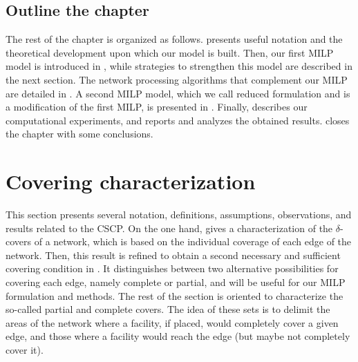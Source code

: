 \subsection{Outline the chapter}
The rest of the chapter is organized as follows.  presents useful notation and the theoretical development upon which our model is built. Then, our first MILP model is introduced in , while strategies to strengthen this model are described in the next section. The network processing algorithms that complement our MILP are detailed in . A second MILP model, which we call reduced formulation and is a modification of the first MILP, is presented in . Finally,  describes our computational experiments, and reports and analyzes the obtained results.  closes the chapter with some conclusions.





\section{Covering characterization}\label{sec:prelim}
This section presents several notation, definitions, assumptions, observations, and results related to the CSCP. On the one hand,  gives a characterization of the $\delta$-covers of a network, which is based on the individual coverage of each edge of the network. Then, this result is refined to obtain a second necessary and sufficient covering condition in . It distinguishes between two alternative possibilities for covering each edge, namely complete or partial, and will be useful for our MILP formulation and methods. The rest of the section is oriented to characterize the so-called partial and complete covers. The idea of these sets is to delimit the areas of the network where a facility, if placed, would completely cover a given edge, and those where a facility would reach the edge (but maybe not completely cover it).




